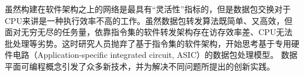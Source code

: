 虽然构建在软件架构之上的网络是最具有“灵活性”指标的，但是数据包交换对于CPU来讲是一种执行效率不高的工作。虽然数据包转发算法既简单、又高效，但面对无穷无尽的任务量，依靠指令集的软件转发架构存在访存效率差、CPU无法批处理等劣势。这时研究人员抛弃了基于指令集的软件架构，开始思考基于专用硬件电路（Application-specific integrated circuit, ASIC）的数据包处理模型。
%
数据平面可编程概念引发了众多新技术，并为解决不同问题所提出的创新实践。
